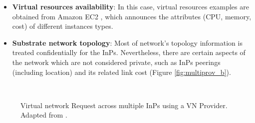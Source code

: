 \begin{itemize}
	\item \textbf{Virtual resources availability}: In this case, virtual resources examples are obtained from Amazon EC2 \cite{amazonEC2}, which announces the attributes (CPU, memory, cost) of different instances types.
	\item \textbf{Substrate network topology}: Most of network's topology information is treated confidentially for the InPs. Nevertheless, there are certain aspects of the network which are not considered private, such as InPs peerings (including location) and its related link cost (Figure \ref{fig:multiprov_b}).
\end{itemize}

\begin{figure}[bth]
	\myfloatalign
	 \quad
	 \\
	\caption{Virtual network Request across multiple InPs using a VN Provider. Adapted from \citep{dietrich2015multi}.}
	\label{fig:multiprov}
\end{figure}

